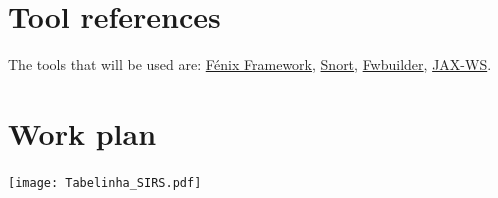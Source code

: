 \documentclass[12pt,paper=a4]{article}
\begin{document}
\section{Tool references}
The tools that will be used are: \href{https://fenix-framework.github.io/}{Fénix Framework}, \href{https://www.snort.org/}{Snort}, \href{http://www.fwbuilder.org/}{Fwbuilder}, \href{https://jax-ws.java.net/}{JAX-WS}.

\section{Work plan}
\texttt{[image: Tabelinha\_SIRS.pdf]}
\end{document}
